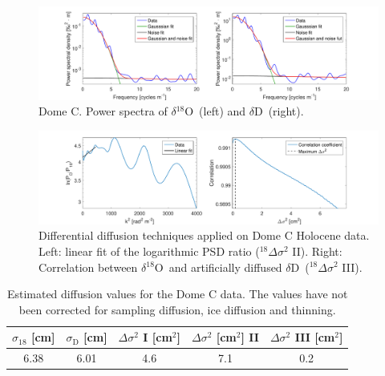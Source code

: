 \documentclass[11pt, draftcls, onecolumn]{IEEEtran} %
\numberwithin{equation}{section}
\numberwithin{table}{section}
\numberwithin{figure}{section}
\newcommand{\delOx}{$\delta{}^{18}\mathrm{O}$}
\newcommand{\delD}{$\delta\mathrm{D}$}
\begin{document}
\begin{appendices}
\begin{figure}[H]
	\vspace*{2mm}
	\centering
	\includegraphics[width=1\textwidth]{Figure_46}
	\caption{Dome C. Power spectra of \delOx~(left) and \delD~(right).}  \label{fig:DomeC_fig_1}
\end{figure}

\begin{figure}[H]
	\vspace*{2mm}
	\begin{center}
		\includegraphics[width=1\textwidth]{Figure_47}
		\caption{Differential diffusion techniques applied on Dome C Holocene data. 
			Left: linear fit of the logarithmic PSD ratio ($^{18}\Delta\sigma^2$ II). Right: 
			Correlation between \delOx~and artificially diffused \delD~($^{18}\Delta\sigma^2$ III).}  \label{fig:DomeC_fig_2}
	\end{center}
\end{figure}

\begin{table}[H]
	\center
	\caption{Estimated diffusion values for the Dome C data.
		The values have not been corrected for sampling diffusion, ice diffusion and thinning.}
	\label{DomeC}
	\begin{tabular}{c c c c c} 
		\toprule
		$\sigma_{18}$ [cm] & $\sigma_\mathrm{D}$ [cm] & $\Delta\sigma^2$ I [cm$^2$] & $\Delta\sigma^2$ [cm$^2$] II & $\Delta\sigma^2$ III [cm$^2$] \\
		\midrule
		  6.38 &   6.01 &     4.6 &     7.1 &     0.2 \\
		\bottomrule		
	\end{tabular}
\end{table}


\end{appendices}
\end{document}
